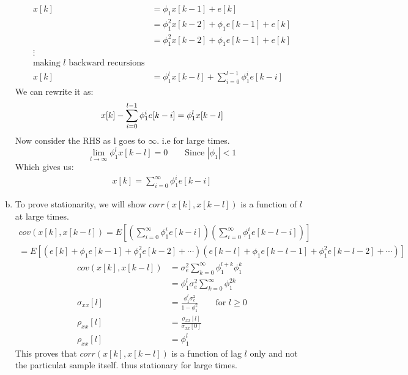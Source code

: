\documentclass[11pt,paper=a4,answers]{exam}
\begin{document}
\begin{questions}
\begin{enumerate}[(a)]
\begin{align}
    x[k] &= \phi_1 x[k-1] + e[k] \nonumber \\
    &= \phi_1^2 x[k-2] + \phi_1 e[k-1] + e[k] \nonumber \\
    &= \phi_1^2 x[k-2] + \phi_1 e[k-1] + e[k] \nonumber \\
    \vdots \nonumber \\
    \text{making $l$ backward recursions} \nonumber\\
    x[k] &= \phi_1 ^l x[k-l] + \sum_{i=0}^{l-1} \phi_1 ^i e[k-i]
\end{align}
We can rewrite it as:
$$
x[k] - \sum_{i=0}^{l-1} \phi_1 ^i e[k-i] =  \phi_1 ^l x[k-l]  \nonumber \\
$$
Now consider the RHS as l goes to $\infty$. i.e for large times.\\
$$
\lim_{l \to \infty} \phi_1 ^l x[k-l] = 0 \qquad \text{Since $|\phi_1| < 1$}
$$
Which gives us:\\
\begin{align}
    x[k] = \sum_{i=0}^{\infty} \phi_1 ^i e[k-i]
\end{align}
\item To prove stationarity, we will show $corr(x[k], x[k-l])$ is a function of $l$ at large times.\\
\begin{align}
    cov(x[k], x[k-l]) = E\left[ \left(\sum_{i=0}^{\infty} \phi_1 ^i e[k-i] \right) \left(\sum_{i=0}^{\infty} \phi_1 ^i e[k-l-i] \right)\right] \nonumber \\
    = E\left[(e[k] + \phi_1 e[k-1] + \phi_1 ^2 e[k-2] + \cdots) (e[k-l] + \phi_1 e[k-l-1] + \phi_1 ^2 e[k-l-2] + \cdots) \right] \nonumber
\end{align}
\begin{align}
    cov(x[k], x[k-l]) &= \sigma_e ^2 \sum_{k=0}^{\infty} \phi_1^{l+k} \phi_1^{k} \nonumber \\
    &= \phi_1 ^l \sigma_e ^2 \sum_{k=0}^{\infty} \phi_1^{2k} \nonumber \\
    \sigma_{xx}[l] &= \frac{\phi_1 ^l \sigma_e ^2}{1-\phi_1 ^2} \qquad \text{for } l \geq 0 \nonumber\\
    \rho_{xx}[l] &= \frac{\sigma_{xx}[l]}{\sigma_{xx}[0]} \nonumber \\
    \rho_{xx}[l] &= \phi_1 ^l \nonumber
\end{align}
This proves that $corr(x[k], x[k-l])$ is a function of lag $l$ only and not the particulat sample itself. thus stationary for large times.\\

\end{enumerate}
\end{questions}
\end{document}
